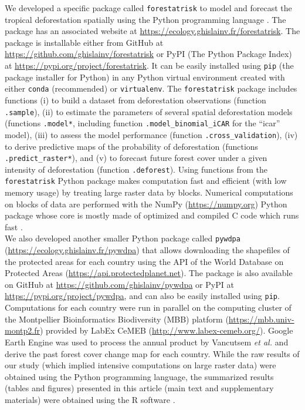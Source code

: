 \documentclass[
  12pt,
]{article}
\begin{document}
We developed a specific package called \texttt{forestatrisk} \citep{Vieilledent2021a} to model and forecast the tropical deforestation spatially using the Python programming language \citep{Python2020}. The package has an associated website at \url{https://ecology.ghislainv.fr/forestatrisk}. The package is installable either from GitHub at \url{https://github.com/ghislainv/forestatrisk} or PyPI (The Python Package Index) at \url{https://pypi.org/project/forestatrisk}. It can be easily installed using \texttt{pip} (the package installer for Python) in any Python virtual environment created with either \texttt{conda} (recommended) or \texttt{virtualenv}. The \texttt{forestatrisk} package includes functions (i) to build a dataset from deforestation observations (function \texttt{.sample}), (ii) to estimate the parameters of several spatial deforestation models (functions \texttt{.model*}, including function \texttt{.model\_binomial\_iCAR} for the ``icar'' model), (iii) to assess the model performance (function \texttt{.cross\_validation}), (iv) to derive predictive maps of the probability of deforestation (functions \texttt{.predict\_raster*}), and (v) to forecast future forest cover under a given intensity of deforestation (function \texttt{.deforest}). Using functions from the \texttt{forestatrisk} Python package makes computation fast and efficient (with low memory usage) by treating large raster data by blocks. Numerical computations on blocks of data are performed with the NumPy (\url{https://numpy.org}) Python package whose core is mostly made of optimized and compiled C code which runs fast \citep{Harris2020}.\\

We also developed another smaller Python package called \texttt{pywdpa} (\url{https://ecology.ghislainv.fr/pywdpa}) that allows downloading the shapefiles of the protected areas for each country using the API of the World Database on Protected Areas (\url{https://api.protectedplanet.net}). The package is also available on GitHub at \url{https://github.com/ghislainv/pywdpa} or PyPI at \url{https://pypi.org/project/pywdpa}, and can also be easily installed using \texttt{pip}.\\

Computations for each country were run in parallel on the computing cluster of the Montpellier Bioinformatics Biodiversity (MBB) platform (\url{https://mbb.univ-montp2.fr}) provided by LabEx CeMEB (\url{http://www.labex-cemeb.org/}). Google Earth Engine \citep{Gorelick2017} was used to process the annual product by Vancutsem \emph{et al.} \citep{Vancutsem2021} and derive the past forest cover change map for each country. While the raw results of our study (which implied intensive computations on large raster data) were obtained using the Python programming language, the summarized results (tables and figures) presented in this article (main text and supplementary materials) were obtained using the R software \citep{R2020}.
\end{document}
